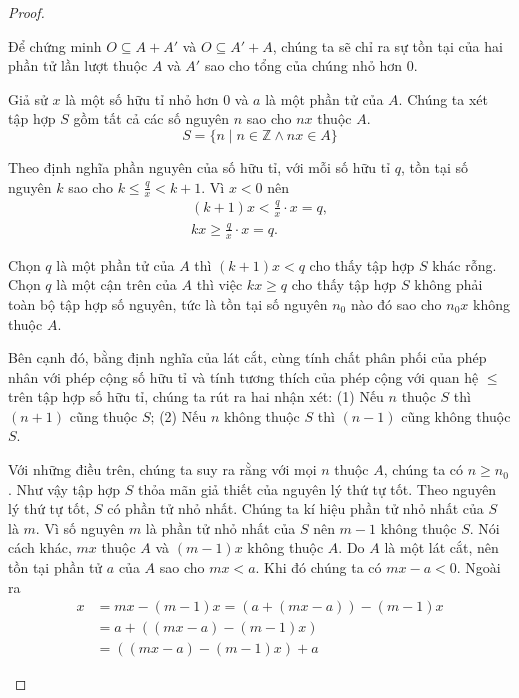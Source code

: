 \begin{proof}
\begin{enumerate}[label={(\roman*)}]
              Để chứng minh $O\subseteq A + A'$ và $O\subseteq A' + A$, chúng ta sẽ chỉ ra sự tồn tại của hai phần tử lần lượt thuộc $A$ và $A'$ sao cho tổng của chúng nhỏ hơn $0$.

              Giả sử $x$ là một số hữu tỉ nhỏ hơn $0$ và $a$ là một phần tử của $A$. Chúng ta xét tập hợp $S$ gồm tất cả các số nguyên $n$ sao cho $nx$ thuộc $A$.
              \[
                  S = \{ n \mid n\in\mathbb{Z} \wedge nx\in A \}
              \]

              Theo định nghĩa phần nguyên của số hữu tỉ, với mỗi số hữu tỉ $q$, tồn tại số nguyên $k$ sao cho $k\leq \frac{q}{x} < k + 1$. Vì $x < 0$ nên
              \[
                  \begin{split}
                      (k + 1)x < \frac{q}{x}\cdot x = q, \\
                      kx \geq \frac{q}{x}\cdot x = q.
                  \end{split}
              \]

              Chọn $q$ là một phần tử của $A$ thì $(k + 1)x < q$ cho thấy tập hợp $S$ khác rỗng. Chọn $q$ là một cận trên của $A$ thì việc $kx\geq q$ cho thấy tập hợp $S$ không phải toàn bộ tập hợp số nguyên, tức là tồn tại số nguyên $n_{0}$ nào đó sao cho $n_{0}x$ không thuộc $A$.

              Bên cạnh đó, bằng định nghĩa của lát cắt, cùng tính chất phân phối của phép nhân với phép cộng số hữu tỉ và tính tương thích của phép cộng với quan hệ $\leq$ trên tập hợp số hữu tỉ, chúng ta rút ra hai nhận xét: (1) Nếu $n$ thuộc $S$ thì $(n + 1)$ cũng thuộc $S$; (2) Nếu $n$ không thuộc $S$ thì $(n - 1)$ cũng không thuộc $S$.

              Với những điều trên, chúng ta suy ra rằng với mọi $n$ thuộc $A$, chúng ta có $n\geq n_{0}$. Như vậy tập hợp $S$ thỏa mãn giả thiết của nguyên lý thứ tự tốt. Theo nguyên lý thứ tự tốt, $S$ có phần tử nhỏ nhất. Chúng ta kí hiệu phần tử nhỏ nhất của $S$ là $m$. Vì số nguyên $m$ là phần tử nhỏ nhất của $S$ nên $m - 1$ không thuộc $S$. Nói cách khác, $mx$ thuộc $A$ và $(m - 1)x$ không thuộc $A$. Do $A$ là một lát cắt, nên tồn tại phần tử $a$ của $A$ sao cho $mx < a$. Khi đó chúng ta có $mx - a < 0$. Ngoài ra
              \begin{align*}
                  x & = mx - (m-1)x = (a + (mx - a)) - (m-1)x \\
                    & = a + ((mx-a) - (m-1)x)                 \\
                    & = ((mx - a) - (m-1)x) + a
              \end{align*}


\end{enumerate}
\end{proof}
